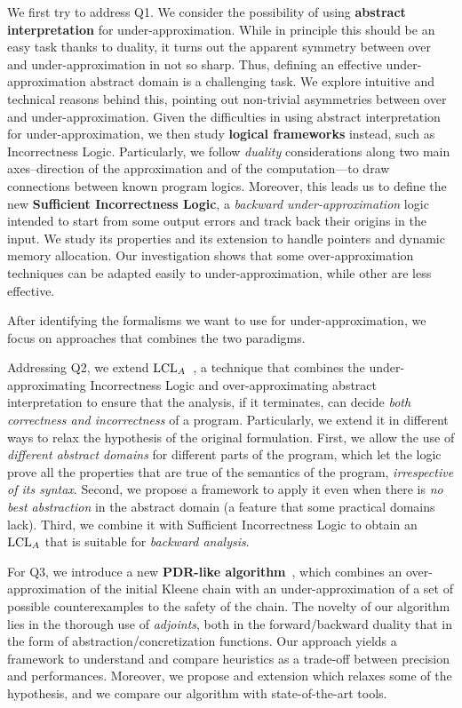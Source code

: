 We first try to address Q1.
We consider the possibility of using \textbf{abstract interpretation} for under\hyp{}approximation. While in principle this should be an easy task thanks to duality, it turns out the apparent symmetry between over and under-approximation in not so sharp. Thus, defining an effective under-approximation abstract domain is a challenging task. We explore intuitive and technical reasons behind this, pointing out non-trivial asymmetries between over and under-approximation.
Given the difficulties in using abstract interpretation for under\hyp{}approximation, we then study \textbf{logical frameworks} instead, such as Incorrectness Logic. Particularly, we follow \emph{duality} considerations along two main axes--direction of the approximation and of the computation---to draw connections between known program logics. Moreover, this leads us to define the new \textbf{Sufficient Incorrectness Logic}, a \emph{backward under-approximation} logic intended to start from some output errors and track back their origins in the input. We study its properties and its extension to handle pointers and dynamic memory allocation.
Our investigation shows that some over-approximation techniques can be adapted easily to under-approximation, while other are less effective.

After identifying the formalisms we want to use for under-approximation, we focus on approaches that combines the two paradigms.

Addressing Q2, we extend \textbf{$\text{LCL}_A$}~\cite{BGGR23}, a technique that combines the under-approximating Incorrectness Logic and over-approximating abstract interpretation to ensure that the analysis, if it terminates, can decide \emph{both correctness and incorrectness} of a program. Particularly, we extend it in different ways to relax the hypothesis of the original formulation. First, we allow the use of \emph{different abstract domains} for different parts of the program, which let the logic prove all the properties that are true of the semantics of the program, \emph{irrespective of its syntax}. Second, we propose a framework to apply it even when there is \emph{no best abstraction} in the abstract domain (a feature that some practical domains lack). Third, we combine it with Sufficient Incorrectness Logic to obtain an $\text{LCL}_A$ that is suitable for \emph{backward analysis}.

For Q3, we introduce a new \textbf{PDR-like algorithm}~\cite{Bradley11}, which combines an over\hyp{}approximation of the initial Kleene chain with an under-approximation of a set of possible counterexamples to the safety of the chain. The novelty of our algorithm lies in the thorough use of \emph{adjoints}, both in the forward/backward duality that in the form of abstraction/concretization functions. Our approach yields a framework to understand and compare heuristics as a trade-off between precision and performances. Moreover, we propose and extension which relaxes some of the hypothesis, and we compare our algorithm with state-of-the-art tools.

